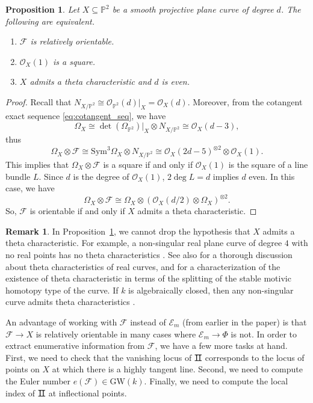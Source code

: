 \documentclass[12pt]{amsart}
\numberwithin{equation}{section}
\theoremstyle{plain}
\newtheorem{prop}[thm]{Proposition}
\theoremstyle{definition}
\newtheorem{rem}[thm]{Remark}
\newcommand{\mb}[1]{\mathbb{#1}}
\newcommand{\mc}[1]{\mathcal{#1}}
\newcommand{\GW}{\mathrm{GW}}
\newcommand{\Sym}{\mathrm{Sym}}
\newcommand{\II}{\sbox0{II}\dimen0=\dimexpr\wd0+1pt\relax
  \makebox[\dimen0]{\rlap{\vrule width\dimen0 height 0.07ex depth 0.07ex}%
    \rlap{\vrule width\dimen0 height\dimexpr\ht0+0.07ex\relax 
            depth\dimexpr-\ht0+0.07ex\relax}%
    \kern.5pt \textnormal{II}\kern.5pt}}
\begin{document}
\begin{prop}\label{prop:relatively_ori}
    Let $X\subseteq\mb{P}^2$ be a smooth projective plane curve of degree $d$. The following are equivalent.
    \begin{enumerate}
        \item $\mc{F}$ is relatively orientable.
        \item $\mc{O}_X(1)$ is a square.
        \item $X$ admits a theta characteristic and $d$ is even.
    \end{enumerate}
\end{prop}
\begin{proof}
    Recall that $N_{X/\mb{P}^2}\cong\mc{O}_{\mb{P}^2}(d)|_X=\mc{O}_X(d)$. Moreover, from the cotangent exact sequence \eqref{eq:cotangent_seq}, we have
    \[\Omega_X\cong\det(\Omega_{\mb{P}^2})|_X \otimes N_{X/\mb{P}^2}\cong\mc{O}_X(d-3),\]
    thus $$\Omega_X\otimes\mc{F}\cong\Sym^3\Omega_X\otimes N_{X/\mb{P}^2}\cong  \mc{O}_X(2d-5)^{\otimes 2}\otimes\mc{O}_X(1).$$
    This implies that $\Omega_X\otimes\mc{F}$ is a square if and only if $\mc{O}_X(1)$ is the square of a line bundle $L$. Since $d$ is the degree of $\mc{O}_X(1)$, $2\deg L = d$ implies $d$ even. In this case, we have
    $$\Omega_X\otimes\mc{F}\cong\Omega_X\otimes
    \left(
    \mc{O}_X(d/2)\otimes\Omega_X
    \right)^{\otimes 2}.
    $$
    So, $\mc{F}$ is orientable if and only if $X$ admits a theta characteristic. 
\end{proof}

\begin{rem}
    In Proposition~\ref{prop:relatively_ori}, we cannot drop the hypothesis that $X$ admits a theta characteristic. For example, a non-singular real plane curve of degree $4$ with no real points has no theta characteristics \cite[Section~5]{MR286136}. See also \cite[Section~5]{MR631748} for a thorough discussion about theta characteristics of real curves, and \cite{MR2672429} for a characterization of the existence of theta characteristic in terms of the splitting of the stable motivic homotopy type of the curve. 
    If $k$ is algebraically closed, then any non-singular curve admits theta characteristics \cite[Section~4]{MR292836}.
\end{rem}
 


An advantage of working with $\mc{F}$ instead of $\mc{E}_m$ (from earlier in the paper) is that $\mc{F}\to X$ is relatively orientable in many cases where $\mc{E}_m\to\Phi$ is not. In order to extract enumerative information from $\mc{F}$, we have a few more tasks at hand. First, we need to check that the vanishing locus of $\II$ corresponds to the locus of points on $X$ at which there is a highly tangent line. Second, we need to compute the Euler number $e(\mc{F})\in\GW(k)$. Finally, we need to compute the local index of $\II$ at inflectional points.
\end{document}
